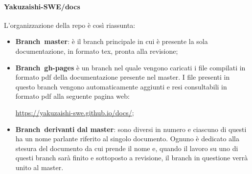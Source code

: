         \paragraph{Yakuzaishi-SWE/docs}
        L'organizzazione della repo è così riassunta:
        \begin{itemize}
            \item \textbf{Branch\glo\ master}: è il branch principale in cui è presente la sola documentazione, in formato tex, pronta alla revisione;
            \item \textbf{Branch\glo\ gh-pages} è un branch nel quale vengono caricati i file compilati in formato pdf della documentazione presente nel master. I file presenti in questo branch vengono automaticamente aggiunti e resi consultabili in formato pdf alla seguente pagina web:
            \begin{center}
                \url{https://yakuzaishi-swe.github.io/docs/};
            \end{center}
            \item \textbf{Branch\glo\ derivanti dal master}: sono diversi in numero e ciascuno di questi ha un nome parlante riferito al singolo documento. Ognuno è dedicato alla stesura del documento da cui prende il nome e, quando il lavoro su uno di questi branch sarà finito e sottoposto a revisione, il branch in questione verrà unito al master.
        \end{itemize}

